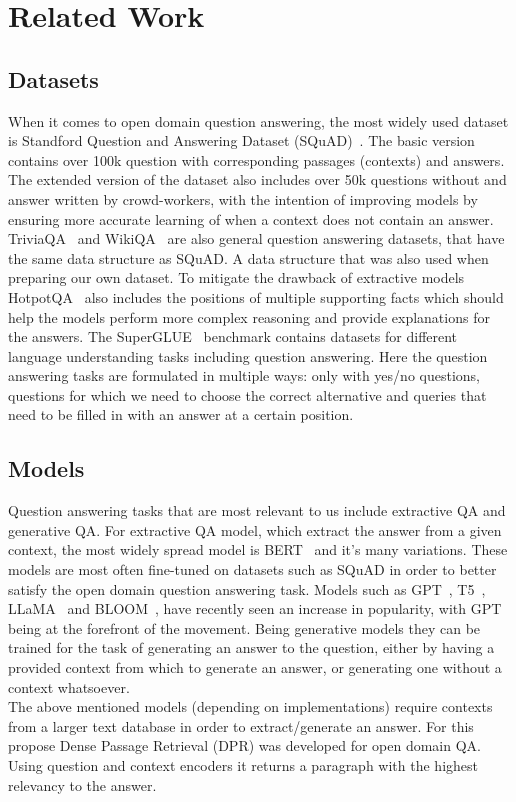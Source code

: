 \documentclass[fleqn,moreauthors,10pt]{ds_report}
\begin{document}
\section*{Related Work}

\subsection*{Datasets}
When it comes to open domain question answering, the most widely used dataset is Standford Question and Answering Dataset (SQuAD)~\cite{rajpurkar2016squad, rajpurkar2018squadv2}.
The basic version contains over 100k question with corresponding passages (contexts) and answers.
The extended version of the dataset also includes over 50k questions without and answer written by crowd-workers, with the intention of improving models by ensuring more accurate learning of when a context does not contain an answer.
TriviaQA~\cite{joshi2017triviaqa} and WikiQA~\cite{yang2015wikiqa} are also general question answering datasets, that have the same data structure as SQuAD.
A data structure that was also used when preparing our own dataset. 
To mitigate the drawback of extractive models HotpotQA~\cite{yang2018hotpotqa} also includes the positions of multiple supporting facts which should help the models perform more complex reasoning and provide explanations for the answers.
The SuperGLUE~\cite{SuperGLUE} benchmark contains datasets for different language understanding tasks including question answering. 
Here the question answering tasks are formulated in multiple ways: only with yes/no questions, questions for which we need to choose the correct alternative and queries that need to be filled in with an answer at a certain position.

\subsection*{Models}
Question answering tasks that are most relevant to us include extractive QA and generative QA.
For extractive QA model, which extract the answer from a given context, the most widely spread model is BERT~\cite{devlin2018bert} and it's many variations.
These models are most often fine-tuned on datasets such as SQuAD in order to better satisfy the open domain question answering task.
Models such as GPT~\cite{openai2023gpt4}, T5~\cite{T5}, LLaMA~\cite{touvron2023llama} and BLOOM~\cite{scao2022bloom}, have recently seen an increase in popularity, with GPT being at the forefront of the movement.
Being generative models they can be trained for the task of generating an answer to the question, either by having a provided context from which to generate an answer, or generating one without a context whatsoever. \\
The above mentioned models (depending on implementations) require contexts from a larger text database in order to extract/generate an answer. 
For this propose Dense Passage Retrieval (DPR) \cite{karpukhin2020dense} was developed for open domain QA. 
Using question and context encoders it returns a paragraph with the highest relevancy to the answer.
\end{document}
